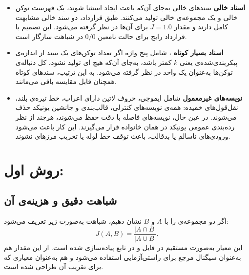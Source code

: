 \documentclass[11pt,a4paper]{article}
\begin{document}
	\begin{itemize}
		\item \textbf{اسناد خالی} 
		سندهای خالی به‌جای آن‌که باعث ایجاد استثنا شوند، یک فهرست توکن خالی و یک مجموعه‌ی  خالی تولید می‌کنند. طبق قرارداد، دو سند خالی مشابهت کامل دارند و مقدار $J = 1.0$ برای آن‌ها در نظر گرفته می‌شود. این تصمیم با قرارداد رایج برای حالت نامعین $0/0$ در شباهت  سازگار است.
		
		\item \textbf{اسناد بسیار کوتاه} ، شامل پنج واژه\lr{):}
		اگر تعداد توکن‌های یک سند از اندازه‌ی پیکربندی‌شده‌ی  یعنی $k$ کمتر باشد، به‌جای آن‌که هیچ ای تولید نشود، کل دنباله‌ی توکن‌ها به‌عنوان یک  واحد در نظر گرفته می‌شود. به این ترتیب، سندهای کوتاه همچنان قابل مقایسه باقی می‌مانند.
		
		\item \textbf{نویسه‌های غیرمعمول} 
		شامل ایموجی، حروف لاتین دارای اعراب، خط تیره‌ی بلند، نقل‌قول‌های خمیده:
		همه‌ی نویسه‌های کنترلی، قالب‌بندی و جانشین یونیکد حذف می‌شوند. در عین حال، نویسه‌های فاصله با دقت حفظ می‌شوند، هرچند از نظر رده‌بندی عمومی یونیکد در همان خانواده قرار می‌گیرند. این کار باعث می‌شود ورودی‌های ناسالم یا بدقالب، باعث توقف خط لوله یا تخریب مرزهای  نشوند.
	\end{itemize}
	
	\section{روش اول: }
	
	\subsection{شباهت دقیق  و هزینه‌ی آن}
	
	اگر دو مجموعه‌ی  را با $A$ و $B$ نشان دهیم، شباهت  به‌صورت زیر تعریف می‌شود:
	$$
	J(A, B) = \frac{|A \cap B|}{|A \cup B|}.
	$$
	این معیار به‌صورت مستقیم در فایل  و در تابع  پیاده‌سازی شده است. از این مقدار هم به‌عنوان سیگنال مرجع برای راستی‌آزمایی استفاده می‌شود و هم به‌عنوان معیاری که  برای تقریب آن طراحی شده است.
	
\end{document}
